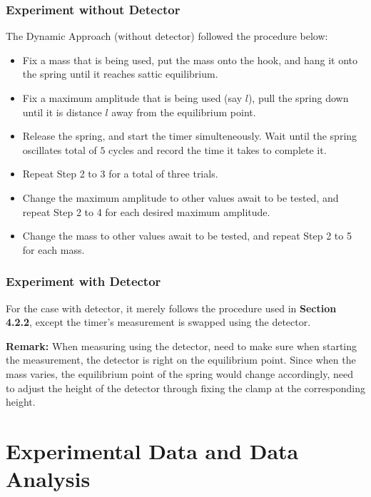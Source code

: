 \documentclass{article}
\begin{document}
\subsubsection{Experiment without Detector}
The Dynamic Approach (without detector) followed the procedure below:
\begin{itemize}
    \item[1.] Fix a mass that is being used, put the mass onto the hook, and hang it onto the spring until it reaches sattic equilibrium.
    \item[2.] Fix a maximum amplitude that is being used (say $l$), pull the spring down until it is distance $l$ away from the equilibrium point.
    \item[3.] Release the spring, and start the timer simulteneously. Wait until the spring oscillates total of $5$ cycles and record the time it takes to complete it.
    \item[4.] Repeat Step 2 to 3 for a total of three trials. 
    \item[5.] Change the maximum amplitude to other values await to be tested, and repeat Step 2 to 4 for each desired maximum amplitude.
    \item[6.] Change the mass to other values await to be tested, and repeat Step 2 to 5 for each mass.   
\end{itemize}

\subsubsection{Experiment with Detector}
For the case with detector, it merely follows the procedure used in \textbf{Section 4.2.2}, except the timer's measurement is swapped using the detector.

\textbf{Remark:} When measuring using the detector, need to make sure when starting the measurement, the detector is right on the equilibrium point. Since when the mass varies, the equilibrium point of the spring would change accordingly, need to adjust the height of the detector through fixing the clamp at the corresponding height.

\newpage

\section{Experimental Data and Data Analysis}
\end{document}
